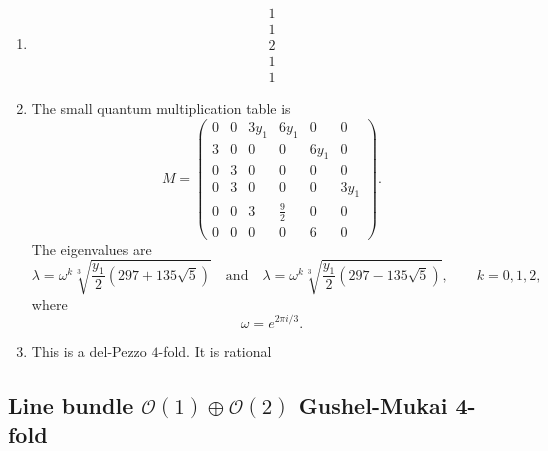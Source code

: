 \documentclass[11pt]{amsart}
\newcounter{num}[section] %
\begin{document}
\begin{enumerate}
    \item [1)]
    \[
    \begin{array}{c}
         1  \\
          1\\
          2\\
          1\\
          1
    \end{array}
    \]

\item [2)]  The small quantum multiplication table is
\[
M=
\begin{pmatrix}
0&0&3y_1&6y_1&0&0\\
3&0&0&0&6y_1&0\\
0&3&0&0&0&0\\
0&3&0&0&0&3y_1\\
0&0&3&\frac92&0&0\\
0&0&0&0&6&0
\end{pmatrix}.
\]
The eigenvalues are
\[
\lambda=\omega^k\sqrt[3]{\frac{y_1}{2}\left(297+135\sqrt5\right)}
\quad\text{and}\quad
\lambda=\omega^k\sqrt[3]{\frac{y_1}{2}\left(297-135\sqrt5\right)},
\qquad k=0,1,2,
\]
where
\[
\omega=e^{2\pi i/3}.
\]

\item[3)] This is a del-Pezzo $4$-fold. It is rational
\end{enumerate}

\subsection{Line bundle $\mathcal{O}(1) \oplus \mathcal{O}(2)$ Gushel-Mukai 4-fold}
\end{document}
